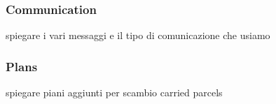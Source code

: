         \subsubsection{Communication}
            spiegare i vari messaggi e il tipo di comunicazione che usiamo

        \subsubsection{Plans}
            spiegare piani aggiunti per scambio carried parcels 

            

        
